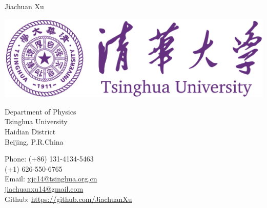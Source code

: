 \documentclass[10pt,a4paper]{article}
\begin{document}
\sloppy  %

\begin{minipage}[t]{0.495\textwidth}
{\huge Jiachuan Xu}
\end{minipage}
\begin{minipage}[t]{0.495\textwidth}
    \includegraphics[totalheight=0.8in]{thu-whole-logo.png}
\end{minipage}
\bigskip

\begin{minipage}[t]{0.495\textwidth}
  Department of Physics \\
  Tsinghua University \\
  Haidian District\\
  Beijing, P.R.China
\end{minipage}
\begin{minipage}[t]{0.495\textwidth}
  Phone: (+86) 131-4134-5463 \\
  \phantom{Phone: }(+1) 626-550-6765\\
  Email: \href{mailto:xjc14@tsinghua.org.cn}{xjc14@tsinghua.org.cn}\\
  \phantom{Email:} \href{mailto:jiachuanxu14@gmail.com}{jiachuanxu14@gmail.com}\\
  Github: \href{https://github.com/JiachuanXu}{https://github.com/JiachuanXu}
\end{minipage}



\nobreakvspace{0.3em}  %




\spacedhrule{0.4em}{0.8em}  %
\end{document}
